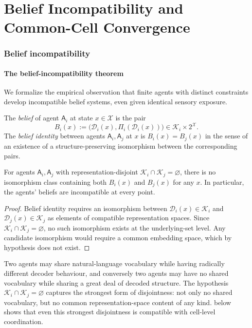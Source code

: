 \documentclass[11pt,twocolumn,a4paper]{article}
\newcommand{\K}{\mathcal{K}}
\newcommand{\D}{\mathcal{D}}
\newcommand{\X}{\mathcal{X}}
\newcommand{\agent}{\mathsf{A}}
\begin{document}
\part{Belief Incompatibility and Common-Cell Convergence}

\section{Belief incompatibility}
\label{sec:incompatibility}

\subsection{The belief-incompatibility theorem}

We formalize the empirical observation that finite agents with distinct
constraints develop incompatible belief systems, even given identical
sensory exposure.

\begin{definition}[Belief]\label{def:belief}
The \emph{belief} of agent $\agent_i$ at state $x\in\X$ is the pair
\[
B_i(x):=\bigl(\D_i(x),\Pi_i(\D_i(x))\bigr)\in\K_i\times 2^\X.
\]
The \emph{belief identity} between agents $\agent_i,\agent_j$ at $x$ is
$B_i(x)=B_j(x)$ in the sense of an existence of a structure-preserving
isomorphism between the corresponding pairs.
\end{definition}

\begin{theorem}\label{thm:incompat}
For agents $\agent_i,\agent_j$ with representation-disjoint
$\K_i\cap\K_j=\varnothing$, there is no isomorphism class containing
both $B_i(x)$ and $B_j(x)$ for any $x$. In particular, the agents'
beliefs are incompatible at every point.
\end{theorem}

\begin{proof}
Belief identity requires an isomorphism between
$\D_i(x)\in\K_i$ and $\D_j(x)\in\K_j$ as elements of compatible
representation spaces. Since $\K_i\cap\K_j=\varnothing$, no such
isomorphism exists at the underlying-set level. Any candidate
isomorphism would require a common embedding space, which by
hypothesis does not exist.
\end{proof}

\begin{remark}
Two agents may share natural-language vocabulary while having radically
different decoder behaviour, and conversely two agents may have no
shared vocabulary while sharing a great deal of decoded structure. The
hypothesis $\K_i\cap\K_j=\varnothing$ captures the strongest form of
disjointness: not only no shared vocabulary, but no common
representation-space content of any kind.  below shows
that even this strongest disjointness is compatible with cell-level
coordination.
\end{remark}
\end{document}
